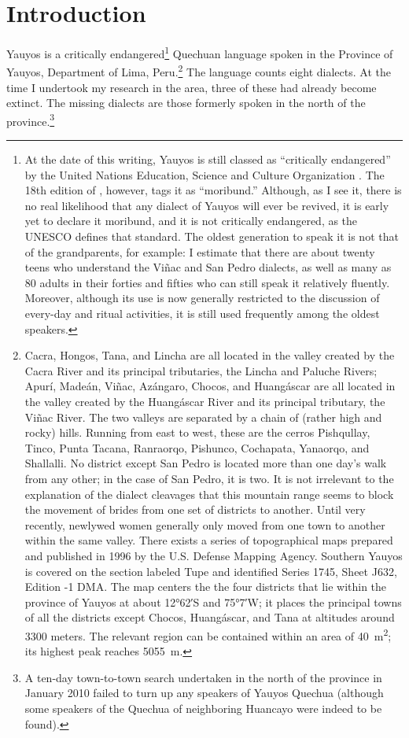 \chapter{Introduction}\label{ch:introduction}
Yauyos is a critically endangered\footnote{At the date of this writing, Yauyos is still classed as “critically endangered” by the United Nations Education, Science and Culture Organization \citep{UNESCO}. The 18th edition of \underline{} \citep{ethnologue}, however, tags it as “moribund.” Although, as I see it, there is no real likelihood that any dialect of Yauyos will ever be revived, it is early yet to declare it moribund, and it is not critically endangered, as the UNESCO defines that standard. The oldest generation to speak it is not that of the grandparents, for example: I estimate that there are about twenty teens who understand the Viñac and San Pedro dialects, as well as many as 80 adults in their forties and fifties who can still speak it relatively fluently. Moreover, although its use is now generally restricted to the discussion of every-day and ritual activities, it is still used frequently among the oldest speakers.} Quechuan language spoken in the Province of Yauyos, Department of Lima, Peru.\footnote{Cacra, Hongos, Tana, and Lincha are all located in the valley created by the Cacra River and its principal tributaries, the Lincha and Paluche Rivers; Apurí, Madeán, Viñac, Azángaro, Chocos, and Huangáscar are all located in the valley created by the Huangáscar River and its principal tributary, the Viñac River. The two valleys are separated by a chain of (rather high and rocky) hills. Running from east to west, these are the cerros Pishqullay, Tinco, Punta Tacana, Ranraorqo, Pishunco, Cochapata, Yanaorqo, and Shallalli. No district except San Pedro is located more than one day’s walk from any other; in the case of San Pedro, it is two. It is not irrelevant to the explanation of the dialect cleavages that this mountain range seems to block the movement of brides from one set of districts to another. Until very recently, newlywed women generally only moved from one town to another within the same valley. There exists a series of topographical maps prepared and published in 1996 by the U.S. Defense Mapping Agency. Southern Yauyos is covered on the section labeled Tupe and identified Series 1745, Sheet J632, Edition -1 DMA. The map centers the the four districts that lie within the province of Yauyos at about 12°62′S and 75°7′W; it places the principal towns of all the districts except Chocos, Huangáscar, and Tana at altitudes around 3300 meters. The relevant region can be contained within an area of 40~m\textsuperscript{2}; its highest peak reaches 5055~m.} The language counts eight dialects. At the time I undertook my research in the area, three of these had already become extinct. The missing dialects are those formerly spoken in the north of the province.\footnote{A ten-day town-to-town search undertaken in the north of the province in January 2010 failed to turn up any speakers of Yauyos Quechua (although some speakers of the Quechua of neighboring Huancayo were indeed to be found).} 